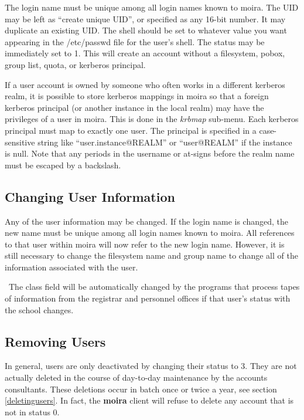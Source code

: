 \documentclass{book}
\begin{document}
The login name must be unique among all login names known to moira.
The UID may be left as ``create unique UID'', or specified as any 16-bit
number.  It may duplicate an existing UID.  The shell should be set to
whatever value you want appearing in the /etc/passwd file for the
user's shell.  The status may be immediately set to 1.  This will
create an account without a filesystem, pobox, group list, quota, or
kerberos principal.

If a user account is owned by someone who often works in a different
kerberos realm, it is possible to store kerberos mappings in moira so
that a foreign kerberos principal (or another instance in the local
realm) may have the privileges of a user in moira.  This is done in
the {\em krbmap} sub-menu.  Each kerberos principal must map to exactly
one user.  The principal is specified in a case-sensitive string like
``user.instance@REALM'' or ``user@REALM'' if the instance is null.
Note that any periods in the username or at-signs before the realm
name must be escaped by a backslash.

\subsection{Changing User Information}

Any of the user information may be changed.  If the login name is
changed, the new name must be unique among all login names known to
moira.  All references to that user within moira will now refer to the
new login name.  However, it is still necessary to change the
filesystem name and group name to change all of the information
associated with the user.

\athena\ The class field will be automatically changed by the programs that
process tapes of information from the registrar and personnel offices
if that user's status with the school changes.

\subsection{Removing Users}

In general, users are only deactivated by changing their status to 3.
They are not actually deleted in the course of day-to-day maintenance
by the accounts consultants.  These deletions occur in batch once or
twice a year, see section \ref{deletingusers}.  In fact, the
{\bf moira} client will refuse to delete any account that is not in
status 0.
\end{document}
